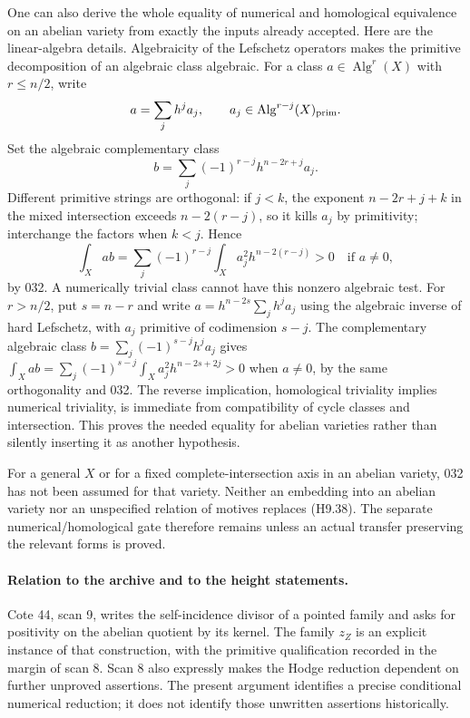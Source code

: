 One can also derive the whole equality of numerical and homological
equivalence on an abelian variety from exactly the inputs already
accepted. Here are the linear-algebra details. Algebraicity of the
Lefschetz operators makes the primitive decomposition of an algebraic
class algebraic. For a class $a\in\operatorname{Alg}^r(X)$ with
$r\le n/2$, write
\[
 a=\sum_j h^j a_j,
 \qquad a_j\in\operatorname{Alg}^{r-j}(X)_{\rm prim}.
\]
Set the algebraic complementary class
\[
 b=\sum_j(-1)^{r-j}h^{n-2r+j}a_j.
\]
Different primitive strings are orthogonal: if $j<k$, the exponent
$n-2r+j+k$ in the mixed intersection exceeds
$n-2(r-j)$, so it kills $a_j$ by primitivity; interchange the factors
when $k<j$. Hence
\[
 \int_X ab
   =\sum_j(-1)^{r-j}\int_Xa_j^2h^{n-2(r-j)}>0
       \quad\text{if }a\ne0,                               \tag{H9.38}
\]
by 032. A numerically trivial class cannot have this nonzero algebraic
test. For $r>n/2$, put $s=n-r$ and write
$a=h^{n-2s}\sum_j h^j a_j$ using the algebraic inverse of hard
Lefschetz, with $a_j$ primitive of codimension $s-j$. The complementary
algebraic class $b=\sum_j(-1)^{s-j}h^j a_j$ gives
$\int_Xab=\sum_j(-1)^{s-j}\int_Xa_j^2h^{n-2s+2j}>0$
when $a\ne0$, by the same orthogonality and 032. The reverse
implication, homological triviality implies numerical triviality,
is immediate from compatibility of cycle classes and intersection.
This proves the needed equality for abelian varieties rather than
silently inserting it as another hypothesis.

For a general $X$ or for a fixed complete-intersection axis in an
abelian variety, 032 has not been assumed for that variety. Neither
an embedding into an abelian variety nor an unspecified relation of
motives replaces (H9.38). The separate numerical/homological gate
therefore remains unless an actual transfer preserving the relevant
forms is proved.

\paragraph{Relation to the archive and to the height statements.}
Cote 44, scan 9, writes the self-incidence divisor of a pointed family
and asks for positivity on the abelian quotient by its kernel. The
family $z_Z$ is an explicit instance of that construction, with the
primitive qualification recorded in the margin of scan 8. Scan 8
also expressly makes the Hodge reduction dependent on further
unproved assertions. The present argument identifies a precise
conditional numerical reduction; it does not identify those
unwritten assertions historically.

